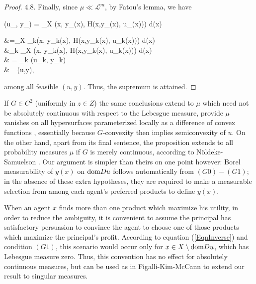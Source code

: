 \begin{proof}
	4.8. Finally, since $\mu \ll \mathcal{L}^m$, by Fatou's lemma, we have 
		\begin{flalign*}
			\tilde{\Pi}(u_{\infty}, y_{\infty}) = \int_{X} \pi(x, y_{\infty}(x), H(x,y_{\infty}(x), u_{\infty}(x))) d\mu(x)  
		\end{flalign*}
		\begin{flalign*}
			\hspace{2.65cm}	&=\int_{X} \limsup\limits_{k\rightarrow \infty}\pi(x, y_k(x), H(x,y_k(x), u_k(x))) d\mu(x) 
			\\
			&\ge \limsup\limits_{k\rightarrow \infty} \int_{X} \pi(x, y_k(x), H(x,y_k(x), u_k(x))) d\mu(x) 
			\\
			& = \lim\limits_{k\rightarrow \infty} \tilde{\Pi}(u_k, y_k)\\
			&= \sup \tilde{\Pi}(u,y),
		\end{flalign*}
	among all feasible $(u,y)$. Thus, the supremum is attained.
\end{proof}
											
\begin{remark}
	If $G \in C^2$ (uniformly in $z \in Z$) the same conclusions extend to $\mu$ which need not be absolutely
	continuous with respect to the Lebesgue measure,  provide $\mu$ vanishes on all hypersurfaces parameterized 
	locally as a difference of convex functions \cite{FigalliKimMcCann11} \cite{Gigli11},  essentially because $G$-convexity then implies semiconvexity of $u$.  On the other hand,  apart from its final sentence,  
	the proposition extends to all probability measures $\mu$ if $G$ is merely continuous, according to 
	N\"oldeke-Samuelson \cite{NoldekeSamuelson15p}.  Our argument is simpler than
	theirs on one point however:  
	Borel measurability of $y(x)$ on ${\mathop{\rm dom}} Du$ follows automatically from $(G0)-(G1)$;
	in the absence of these extra hypotheses,  they are required to make a measurable selection from among each
	agent's preferred products to define $y(x)$.
\end{remark}
												
\begin{remark} 
	When an agent $x$ finds more than one product which maximize his utility, in order to reduce the ambiguity, it is convenient to assume the principal has satisfactory persuasion to  convince the agent to choose one of those products which maximize the principal's profit. 
	According to equation (\ref{EqnInverse}) and condition $(G1)$, this scenario would occur only for $x\in X \setminus {\mathop{\rm dom}} Du $, which has Lebesgue measure zero. Thus, this convention has no effect for absolutely continuous measures, 
	but can be used as in Figalli-Kim-McCann \cite{FigalliKimMcCann11} to extend our result to singular measures.
\end{remark}
													
													
													
													
													

